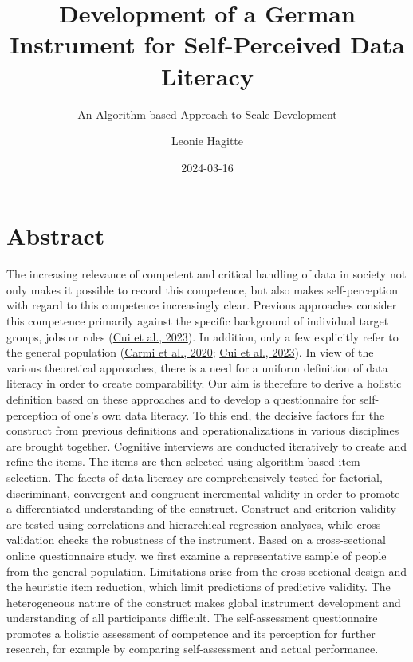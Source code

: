 \documentclass[
  12pt,
  a4paper,
  twoside]{article}
\title{Development of a German Instrument for Self-Perceived Data Literacy}
\subtitle{An Algorithm-based Approach to Scale Development}
\author{Leonie Hagitte}
\date{2024-03-16}
\begin{document}
\maketitle

{
\setcounter{tocdepth}{2}
\tableofcontents
}
\newpage\null\thispagestyle{empty}\newpage

\hypertarget{abstract}{%
\section*{Abstract}\label{abstract}}

The increasing relevance of competent and critical handling of data in society not only makes it possible to record this competence, but also makes self-perception with regard to this competence increasingly clear. Previous approaches consider this competence primarily against the specific background of individual target groups, jobs or roles (\protect\hyperlink{ref-Cui2023}{Cui et al., 2023}). In addition, only a few explicitly refer to the general population (\protect\hyperlink{ref-Carmi2020}{Carmi et al., 2020}; \protect\hyperlink{ref-Cui2023}{Cui et al., 2023}). In view of the various theoretical approaches, there is a need for a uniform definition of data literacy in order to create comparability.
Our aim is therefore to derive a holistic definition based on these approaches and to develop a questionnaire for self-perception of one's own data literacy. To this end, the decisive factors for the construct from previous definitions and operationalizations in various disciplines are brought together. Cognitive interviews are conducted iteratively to create and refine the items. The items are then selected using algorithm-based item selection. The facets of data literacy are comprehensively tested for factorial, discriminant, convergent and congruent incremental validity in order to promote a differentiated understanding of the construct. Construct and criterion validity are tested using correlations and hierarchical regression analyses, while cross-validation checks the robustness of the instrument.
Based on a cross-sectional online questionnaire study, we first examine a representative sample of people from the general population. Limitations arise from the cross-sectional design and the heuristic item reduction, which limit predictions of predictive validity. The heterogeneous nature of the construct makes global instrument development and understanding of all participants difficult.
The self-assessment questionnaire promotes a holistic assessment of competence and its perception for further research, for example by comparing self-assessment and actual performance.
\end{document}
